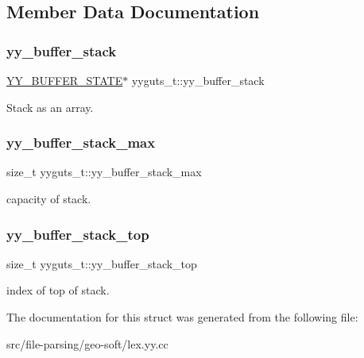 \subsection{Member Data Documentation}
\mbox{\label{structyyguts__t_ad0b9d576189d518a4482f20ed9b2a416}} 
\subsubsection{\texorpdfstring{yy\+\_\+buffer\+\_\+stack}{yy\_buffer\_stack}}
{\footnotesize\ttfamily \mbox{\hyperlink{structyy__buffer__state}{Y\+Y\+\_\+\+B\+U\+F\+F\+E\+R\+\_\+\+S\+T\+A\+TE}}$\ast$ yyguts\+\_\+t\+::yy\+\_\+buffer\+\_\+stack}

Stack as an array. \mbox{\label{structyyguts__t_a4435bb91e87f9988b096afc21386289a}} 
\subsubsection{\texorpdfstring{yy\+\_\+buffer\+\_\+stack\+\_\+max}{yy\_buffer\_stack\_max}}
{\footnotesize\ttfamily size\+\_\+t yyguts\+\_\+t\+::yy\+\_\+buffer\+\_\+stack\+\_\+max}

capacity of stack. \mbox{\label{structyyguts__t_af92507d904af2fcd4509acde654a9850}} 
\subsubsection{\texorpdfstring{yy\+\_\+buffer\+\_\+stack\+\_\+top}{yy\_buffer\_stack\_top}}
{\footnotesize\ttfamily size\+\_\+t yyguts\+\_\+t\+::yy\+\_\+buffer\+\_\+stack\+\_\+top}

index of top of stack. 

The documentation for this struct was generated from the following file\+:\begin{DoxyCompactItemize}
\item 
src/file-\/parsing/geo-\/soft/lex.\+yy.\+cc\end{DoxyCompactItemize}
